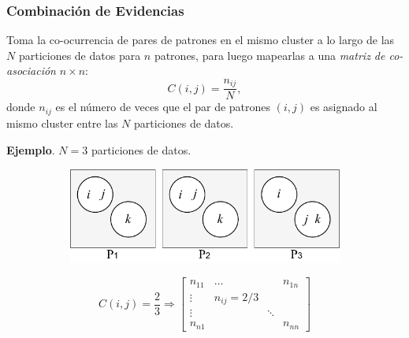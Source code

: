 \begin{frame}
	\frametitle{Combinación de Evidencias}
	Toma la co-ocurrencia de pares de patrones en el mismo cluster a lo largo de las \(N\) particiones de datos para \(n\) patrones, para luego mapearlas a una \textit{matriz de co-asociación} \(n \times n\):
	\medskip
	\[C(i,j)=\frac{n_{ij}}{N},\]
	\medskip
	donde \(n_{ij}\) es el número de veces que el par de patrones \((i,j)\) es asignado al mismo cluster entre las \(N\) particiones de datos.

	\bigskip

	\textbf{Ejemplo}. \(N = 3\) particiones de datos.

\begin{figure}[!htb]
	\centering
	\begin{minipage}{.45\textwidth}
		\begin{figure}
			\centering
			\includegraphics[width=0.9\linewidth]{3_marco_teorico/EAC}
		\end{figure}
	\end{minipage}%
	\begin{minipage}{.45\textwidth}
		\begin{scriptsize}
		\[  C(i,j)=\frac{2}{3} \Rightarrow  \begin{bmatrix}
			n_{11} 	& 	\dots 			   &     &  n_{1n} \\
			\vdots & 	n_{ij} = 2/3  & 	&  \\
			\vdots & 				          & \ddots 	&  \\
			n_{n1} &    					  & 	&  n_{nn}
		\end{bmatrix}\]
	\end{scriptsize}
	\end{minipage}
\end{figure}
\end{frame}

